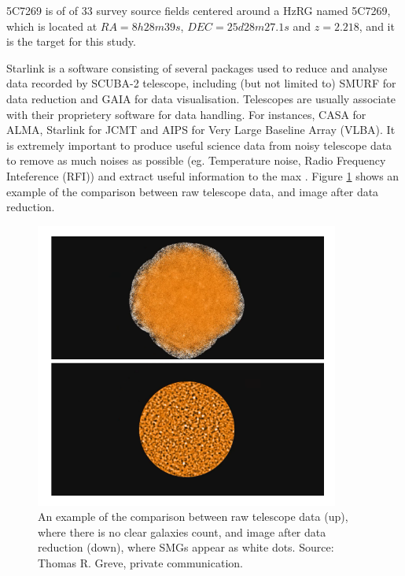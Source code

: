 \documentclass{article}
\begin{document}

\noindent 5C7269 is of of 33 survey source fields centered around a HzRG named 5C7269, which is located at $RA = 8h28m39s$, $DEC = 25d28m27.1s$ and $z = 2.218$, and it is the target for this study.
\medskip

\noindent Starlink is a software consisting of several packages used to reduce and analyse data recorded by SCUBA-2 telescope, including (but not limited to) SMURF for data reduction and GAIA for data visualisation. Telescopes are usually associate with their proprietery software for data handling. For instances, CASA for ALMA, Starlink for JCMT and AIPS for Very Large Baseline Array (VLBA). It is extremely important to produce useful science data from noisy telescope data to remove as much noises as possible (eg. Temperature noise, Radio Frequency Inteference (RFI)) and extract useful information to the max \parencite{Burke2019}. Figure \ref{fig:reducevsunreduce} shows an example of the comparison between raw telescope data, and image after data reduction.

\begin{figure}
    \centering
    \includegraphics[width=100mm]{reducevsunreduce.png}
    \caption{An example of the comparison between raw telescope data (up), where there is no clear galaxies count, and image after data reduction (down), where SMGs appear as white dots. Source: Thomas R. Greve, private communication.}
    \label{fig:reducevsunreduce}
\end{figure}
\end{document}
